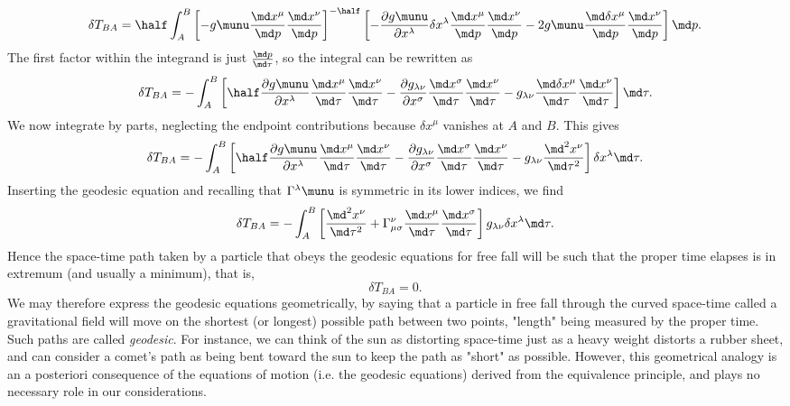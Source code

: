 \begin{equation}
	\delta T_{BA} = \half \int_A^B \left[- g\munu \frac{\md x^\mu}{\md p} \frac{\md x^\nu}{\md p}\right]^{- \half} \left[- \frac{\partial g\munu}{\partial x^\lambda} \delta x^\lambda \frac{\md x^\mu}{\md p} \frac{\md x^\nu}{\md p} - 2 g\munu \frac{\md \delta x^\mu}{\md p} \frac{\md x^\nu}{\md p}\right] \md p.
\end{equation}
The first factor within the integrand is just $\frac{\md p}{\md \tau}$, so the integral can be rewritten as
\begin{equation}
	\delta T_{BA} = - \int_A^B \left[\half \frac{\partial g\munu}{\partial x^\lambda} \frac{\md x^\mu}{\md \tau} \frac{\md x^\nu}{\md \tau} - \frac{\partial g_{\lambda \nu}}{\partial x^\sigma} \frac{\md x^\sigma}{\md \tau} \frac{\md x^\nu}{\md \tau} - g_{\lambda \nu} \frac{\md \delta x^\mu}{\md \tau} \frac{\md x^\nu}{\md \tau} \right] \md \tau.
\end{equation}
We now integrate by parts, neglecting the endpoint contributions because $\delta x^\mu$ vanishes at $A$ and $B$. This gives
\begin{equation}
	\delta T_{BA} = - \int_A^B \left[\half \frac{\partial g\munu}{\partial x^\lambda} \frac{\md x^\mu}{\md \tau} \frac{\md x^\nu}{\md \tau} - \frac{\partial g_{\lambda \nu}}{\partial x^\sigma} \frac{\md x^\sigma}{\md \tau} \frac{\md x^\nu}{\md \tau} - g_{\lambda \nu} \frac{\md^2 x^\nu}{\md \tau^2}\right] \delta x^\lambda \md \tau.
\end{equation}
Inserting the geodesic equation and recalling that $\Gamma^\lambda\munu$ is symmetric in its lower indices, we find
\begin{equation}
	\delta T_{BA} = - \int_A^B \left[\frac{\md^2 x^\nu}{\md \tau^2} + \Gamma^\nu_{\mu \sigma} \frac{\md x^\mu}{\md \tau} \frac{\md x^\sigma}{\md \tau}\right] g_{\lambda \nu} \delta x^\lambda \md \tau.
\end{equation}
Hence the space-time path taken by a particle that obeys the geodesic equations for free fall will be such that the proper time elapses is in extremum (and usually a minimum), that is,
\begin{equation}
\delta T_{BA} = 0.
\end{equation}
We may therefore express the geodesic equations geometrically, by saying that a particle in free fall through the curved space-time called a gravitational field will move on the shortest (or longest) possible path between two points, "length" being measured by the proper time. Such paths are called \emph{geodesic}. For instance, we can think of the sun as distorting space-time just as a heavy weight distorts a rubber sheet, and can consider a comet's path as being bent toward the sun to keep the path as "short" as possible. However, this geometrical analogy is an a posteriori consequence of the equations of motion (i.e. the geodesic equations) derived from the equivalence principle, and plays no necessary role in our considerations.
